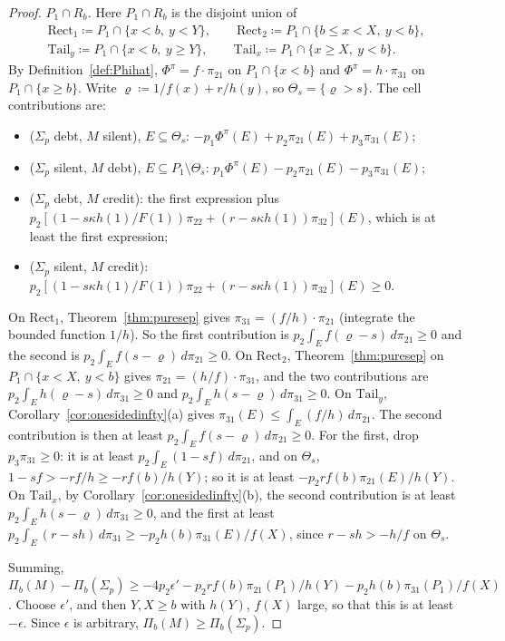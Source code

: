 \documentclass[11pt]{article}
\theoremstyle{definition}\newtheorem{definition}[theorem]{Definition}
\theoremstyle{remark}\newtheorem{remark}[theorem]{Remark}
\begin{document}
\begin{proof}
\emph{$P_1\cap R_b$.} Here $P_1\cap R_b$ is the disjoint union of
\begin{gather*}
 \mathrm{Rect}_1\coloneqq P_1\cap\{x<b,\ y<Y\},\qquad
 \mathrm{Rect}_2\coloneqq P_1\cap\{b\le x<X,\ y<b\},\\
 \mathrm{Tail}_y\coloneqq P_1\cap\{x<b,\ y\ge Y\},\qquad
 \mathrm{Tail}_x\coloneqq P_1\cap\{x\ge X,\ y<b\}.
\end{gather*}
By Definition~\ref{def:Phihat}, $\Phi^\pi=f\cdot\pi_{21}$ on
$P_1\cap\{x<b\}$ and $\Phi^\pi=h\cdot\pi_{31}$ on $P_1\cap\{x\ge b\}$. Write
$\varrho\coloneqq1/f(x)+r/h(y)$, so $\Theta_s=\{\varrho>s\}$. The cell
contributions are:
\begin{itemize}[leftmargin=*,itemsep=1pt]
\item ($\Sigma_p$ debt, $M$ silent), $E\subseteq\Theta_s$:
$-p_1\Phi^\pi(E)+p_2\pi_{21}(E)+p_3\pi_{31}(E)$;
\item ($\Sigma_p$ silent, $M$ debt), $E\subseteq P_1\setminus\Theta_s$:
$p_1\Phi^\pi(E)-p_2\pi_{21}(E)-p_3\pi_{31}(E)$;
\item ($\Sigma_p$ debt, $M$ credit): the first expression plus
$p_2[(1-s\kappa h(1)/F(1))\pi_{22}+(r-s\kappa h(1))\pi_{32}](E)$, which is at
least the first expression;
\item ($\Sigma_p$ silent, $M$ credit):
$p_2[(1-s\kappa h(1)/F(1))\pi_{22}+(r-s\kappa h(1))\pi_{32}](E)\ge0$.
\end{itemize}
On $\mathrm{Rect}_1$, Theorem~\ref{thm:puresep} gives
$\pi_{31}=(f/h)\cdot\pi_{21}$ (integrate the bounded function $1/h$). So the
first contribution is $p_2\int_Ef(\varrho-s)\,d\pi_{21}\ge0$ and the second
is $p_2\int_Ef(s-\varrho)\,d\pi_{21}\ge0$. On $\mathrm{Rect}_2$,
Theorem~\ref{thm:puresep} on $P_1\cap\{x<X,\ y<b\}$ gives
$\pi_{21}=(h/f)\cdot\pi_{31}$, and the two contributions are
$p_2\int_Eh(\varrho-s)\,d\pi_{31}\ge0$ and $p_2\int_Eh(s-\varrho)\,d\pi_{31}
\ge0$. On $\mathrm{Tail}_y$, Corollary~\ref{cor:onesidedinfty}(a) gives
$\pi_{31}(E)\le\int_E(f/h)\,d\pi_{21}$. The second contribution is then at
least $p_2\int_Ef(s-\varrho)\,d\pi_{21}\ge0$. For the first, drop
$p_3\pi_{31}\ge0$: it is at least $p_2\int_E(1-sf)\,d\pi_{21}$, and on
$\Theta_s$, $1-sf>-rf/h\ge-rf(b)/h(Y)$; so it is at least
$-p_2rf(b)\pi_{21}(E)/h(Y)$. On $\mathrm{Tail}_x$, by
Corollary~\ref{cor:onesidedinfty}(b), the second contribution is at least
$p_2\int_Eh(s-\varrho)\,d\pi_{31}\ge0$, and the first at least
$p_2\int_E(r-sh)\,d\pi_{31}\ge-p_2h(b)\pi_{31}(E)/f(X)$, since $r-sh>-h/f$
on $\Theta_s$.

Summing, $\Pi_b(M)-\Pi_b(\Sigma_p)\ge-4p_2\epsilon'-p_2rf(b)\pi_{21}(P_1)/h(Y)
-p_2h(b)\pi_{31}(P_1)/f(X)$. Choose $\epsilon'$, and then $Y,X\ge b$ with
$h(Y)$, $f(X)$ large, so that this is at least $-\epsilon$. Since
$\epsilon$ is arbitrary, $\Pi_b(M)\ge\Pi_b(\Sigma_p)$.
\end{proof}
\end{document}
